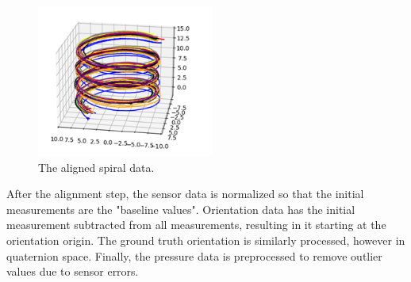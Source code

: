 \begin{figure}[h] 
	\centering \includegraphics[height=5cm]{./images/aligned_data.png}
	\caption{The aligned spiral data.}
\end{figure}

After the alignment step, the sensor data is normalized so that the initial measurements are the "baseline values". Orientation data has the initial measurement subtracted from all measurements, resulting in it starting at the orientation origin. The ground truth orientation is similarly processed, however in quaternion space. Finally, the pressure data is preprocessed to remove outlier values due to sensor errors.

